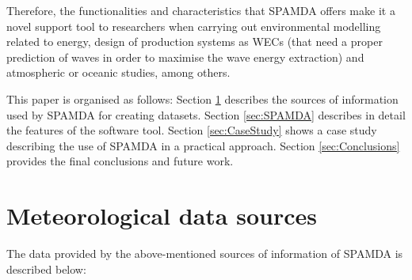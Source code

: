 \documentclass[energies,article,submit,moreauthors,pdftex]{Definitions/mdpi}
\begin{document}
		Therefore, the functionalities and characteristics that SPAMDA offers make it a novel support tool to researchers when carrying out environmental modelling related to energy, design of production systems as WECs (that need a proper prediction of waves in order to maximise the wave energy extraction) and atmospheric or oceanic studies, among others.
			
		This paper is organised as follows: Section \ref{sec:DataSources} describes the sources of information used by SPAMDA for creating datasets. Section \ref{sec:SPAMDA} describes in detail the features of the software tool. Section \ref{sec:CaseStudy} shows a case study describing the use of SPAMDA in a practical approach. Section \ref{sec:Conclusions} provides the final conclusions and future work.
		
	\section{Meteorological data sources}\label{sec:DataSources}
		
		The data provided by the above-mentioned sources of information of SPAMDA is described below:
		
\end{document}

